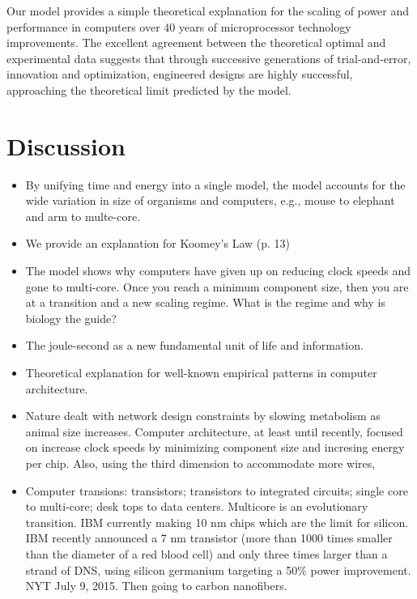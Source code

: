 \documentclass[12pt]{article}
\begin{document}
Our model provides a simple theoretical explanation for the scaling of 
power and performance in computers over 40 years of microprocessor 
technology improvements.  The excellent agreement between the 
theoretical optimal and experimental data suggests that through 
successive generations of trial-and-error, innovation and 
optimization, engineered designs are highly successful, approaching 
the theoretical limit predicted by the model.

\section{Discussion}

\begin{itemize}
\item By unifying time and energy into a single model, the model
  accounts for the wide variation in size of organisms and computers,
  e.g., mouse to elephant and arm to multe-core.

\item We provide an explanation for Koomey's Law (p. 13)

\item The model shows why computers have given up on reducing clock
  speeds and gone to multi-core.  Once you reach a minimum component
  size, then you are at a transition and a new scaling regime.  What
  is the regime and why is biology the guide?

\item The joule-second as a new fundamental unit of life and
  information.

\item Theoretical explanation for well-known empirical patterns in
  computer architecture.

\item Nature dealt with network design constraints by slowing
  metabolism as animal size increases.  Computer architecture, at
  least until recently, focused on increase clock speeds by minimizing
  component size and incresing energy per chip.  Also, using the third dimension to accommodate more wires, 

\item Computer transions: transistors; transistors to
  integrated circuits; single core to multi-core; desk tops to data centers.
Multicore is an evolutionary transition.  IBM currently making 10 nm chips which are the limit for
  silicon.  IBM recently announced a 7 nm
transistor (more than 1000 times smaller than the diameter of a red
blood cell) and only three times larger than a strand of DNS, using
silicon germanium targeting a 50\% power improvement.  NYT July 9,
2015.  Then going to carbon nanofibers. 

\end{itemize}
\end{document}
